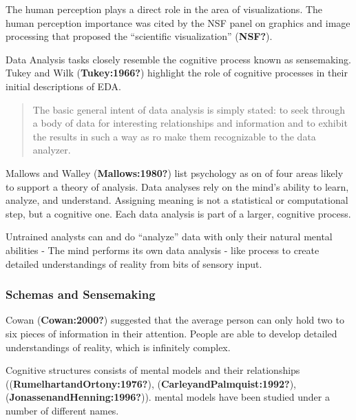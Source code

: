 \documentclass[print]{nuthesis}
\begin{document}
The human perception plays a direct role in the area of visualizations. The human perception importance was cited by the NSF panel on graphics and image processing that proposed the ``scientific visualization'' (\textbf{NSF?}).

Data Analysis tasks closely resemble the cognitive process known as sensemaking. Tukey and Wilk (\textbf{Tukey:1966?}) highlight the role of cognitive processes in their initial descriptions of EDA.

\begin{quote}
The basic general intent of data analysis is simply stated: to seek through a body of data for interesting relationships and information and to exhibit the results in such a way as ro make them recognizable to the data analyzer.
\end{quote}

Mallows and Walley (\textbf{Mallows:1980?}) list psychology as on of four areas likely to support a theory of analysis. Data analyses rely on the mind's ability to learn, analyze, and understand. Assigning meaning is not a statistical or computational step, but a cognitive one. Each data analysis is part of a larger, cognitive process.

Untrained analysts can and do ``analyze'' data with only their natural mental abilities
- The mind performs its own data analysis - like process to create detailed understandings of reality from bits of sensory input.

\hypertarget{schemas-and-sensemaking}{%
\subsubsection{Schemas and Sensemaking}\label{schemas-and-sensemaking}}

Cowan (\textbf{Cowan:2000?}) suggested that the average person can only hold two to six pieces of information in their attention. People are able to develop detailed understandings of reality, which is infinitely complex.

Cognitive structures consists of mental models and their relationships ((\textbf{RumelhartandOrtony:1976?}), (\textbf{CarleyandPalmquist:1992?}), (\textbf{JonassenandHenning:1996?})). mental models have been studied under a number of different names.
\end{document}
